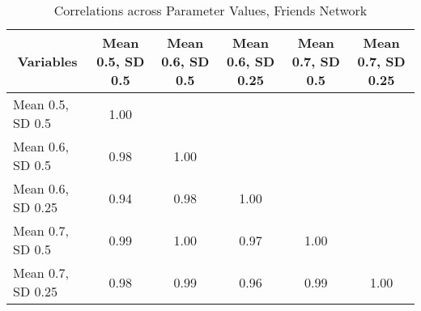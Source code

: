 \begin{table}[htbp]\centering \caption{Correlations across Parameter Values, Friends Network\label{corr_friend}}
\begin{tabular}{l  c  c  c  c  c }\hline\hline
\multicolumn{1}{c}{Variables} &Mean 0.5, SD 0.5&Mean 0.6, SD 0.5&Mean 0.6, SD 0.25&Mean 0.7, SD 0.5&Mean 0.7, SD 0.25\\ \hline
Mean 0.5, SD 0.5&1.00\\
Mean 0.6, SD 0.5&0.98&1.00\\
Mean 0.6, SD 0.25&0.94&0.98&1.00\\
Mean 0.7, SD 0.5&0.99&1.00&0.97&1.00\\
Mean 0.7, SD 0.25&0.98&0.99&0.96&0.99&1.00\\
\hline \hline 
 \end{tabular}
\end{table}
